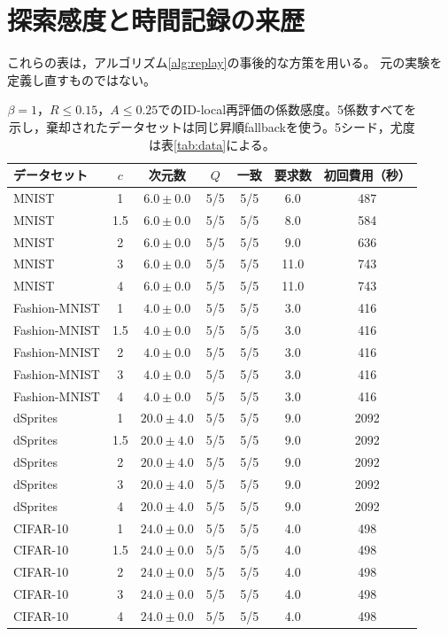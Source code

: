 \documentclass[11pt,a4paper]{ltjsarticle}
\begin{document}
\section{探索感度と時間記録の来歴}\label{app:search}
これらの表は，アルゴリズム\ref{alg:replay}の事後的な方策を用いる。
元の実験を定義し直すものではない。
\begin{table}[H]
\caption{$\beta=1$，$R\le0.15$，$A\le0.25$でのID-local再評価の係数感度。5係数すべてを示し，棄却されたデータセットは同じ昇順fallbackを使う。5シード，尤度は表\ref{tab:data}による。}\label{tab:coefficient}
\small
\setlength{\tabcolsep}{3pt}
\begin{tabular*}{\textwidth}{@{\extracolsep{\fill}}lcccccc@{}}
\toprule
データセット & $c$ & 次元数 & $Q$ & 一致 & 要求数 & 初回費用（秒） \\
\midrule
MNIST & 1 & $6.0 \pm 0.0$ & 5/5 & 5/5 & 6.0 & 487 \\
MNIST & 1.5 & $6.0 \pm 0.0$ & 5/5 & 5/5 & 8.0 & 584 \\
MNIST & 2 & $6.0 \pm 0.0$ & 5/5 & 5/5 & 9.0 & 636 \\
MNIST & 3 & $6.0 \pm 0.0$ & 5/5 & 5/5 & 11.0 & 743 \\
MNIST & 4 & $6.0 \pm 0.0$ & 5/5 & 5/5 & 11.0 & 743 \\
Fashion-MNIST & 1 & $4.0 \pm 0.0$ & 5/5 & 5/5 & 3.0 & 416 \\
Fashion-MNIST & 1.5 & $4.0 \pm 0.0$ & 5/5 & 5/5 & 3.0 & 416 \\
Fashion-MNIST & 2 & $4.0 \pm 0.0$ & 5/5 & 5/5 & 3.0 & 416 \\
Fashion-MNIST & 3 & $4.0 \pm 0.0$ & 5/5 & 5/5 & 3.0 & 416 \\
Fashion-MNIST & 4 & $4.0 \pm 0.0$ & 5/5 & 5/5 & 3.0 & 416 \\
dSprites & 1 & $20.0 \pm 4.0$ & 5/5 & 5/5 & 9.0 & 2092 \\
dSprites & 1.5 & $20.0 \pm 4.0$ & 5/5 & 5/5 & 9.0 & 2092 \\
dSprites & 2 & $20.0 \pm 4.0$ & 5/5 & 5/5 & 9.0 & 2092 \\
dSprites & 3 & $20.0 \pm 4.0$ & 5/5 & 5/5 & 9.0 & 2092 \\
dSprites & 4 & $20.0 \pm 4.0$ & 5/5 & 5/5 & 9.0 & 2092 \\
CIFAR-10 & 1 & $24.0 \pm 0.0$ & 5/5 & 5/5 & 4.0 & 498 \\
CIFAR-10 & 1.5 & $24.0 \pm 0.0$ & 5/5 & 5/5 & 4.0 & 498 \\
CIFAR-10 & 2 & $24.0 \pm 0.0$ & 5/5 & 5/5 & 4.0 & 498 \\
CIFAR-10 & 3 & $24.0 \pm 0.0$ & 5/5 & 5/5 & 4.0 & 498 \\
CIFAR-10 & 4 & $24.0 \pm 0.0$ & 5/5 & 5/5 & 4.0 & 498 \\
\bottomrule\end{tabular*}
\end{table}
\end{document}
